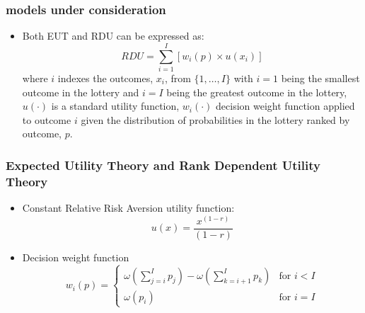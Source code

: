 \documentclass{beamer}
\begin{document}
\begin{frame}
\frametitle{\textcite{Harrison2016} models under consideration}
\begin{itemize}
	\item Both EUT and RDU can be expressed as:
	\begin{equation}
		\label{eq4:RDU}
		RDU = \sum_{i=1}^{I} \left[ w_i(p) \times u(x_i) \right]
	\end{equation}
\noindent where $i$ indexes the outcomes, $x_i$, from $\{1,\ldots,I\}$ with $i=1$ being the smallest outcome in the lottery and $i=I$ being the greatest outcome in the lottery, $u(\cdot)$ is a standard utility function, $w_i(\cdot)$ decision weight function applied to outcome $i$ given the distribution of probabilities in the lottery ranked by outcome, $p$.
\end{itemize}
\end{frame}

\begin{frame}
\frametitle{Expected Utility Theory and Rank Dependent Utility Theory}
\begin{itemize}
	\item Constant Relative Risk Aversion utility function:
	\begin{equation}
		\label{eq4:CRRA}
		u(x) = \frac{x^{(1-r)}}{(1-r)}
	\end{equation}
	\item Decision weight function
	\begin{equation}
		\label{eq4:dweight}
		w_i(p) =
		\begin{cases}
			\omega\left(\displaystyle\sum_{j=i}^I p_j\right) - \omega\left(\displaystyle\sum_{k=i+1}^I p_k\right) & \text{for } i<I \\
			\omega(p_i) & \text{for } i = I
		\end{cases}
	\end{equation}
\end{itemize}
\end{frame}
\end{document}
